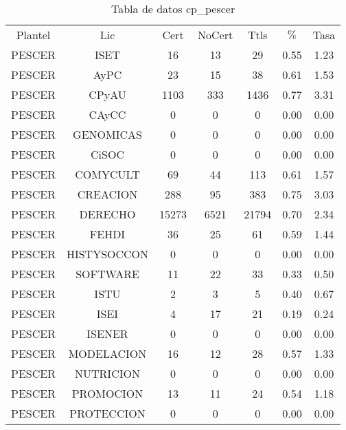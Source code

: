 \documentclass[12pt]{article}
\begin{document}
\begin{table}[h]
\centering
\begin{tabular}{ccccccc}

Plantel & Lic & Cert & NoCert & Ttls & $\%$ & Tasa \\

PESCER & ISET & 16 & 13 & 29 & 0.55 & 1.23 \\
PESCER & AyPC & 23 & 15 & 38 & 0.61 & 1.53 \\
PESCER & CPyAU & 1103 & 333 & 1436 & 0.77 & 3.31 \\
PESCER & CAyCC & 0 & 0 & 0 & 0.00 & 0.00 \\
PESCER & GENOMICAS & 0 & 0 & 0 & 0.00 & 0.00 \\
PESCER & CiSOC & 0 & 0 & 0 & 0.00 & 0.00 \\
PESCER & COMYCULT & 69 & 44 & 113 & 0.61 & 1.57 \\
PESCER & CREACION & 288 & 95 & 383 & 0.75 & 3.03 \\
PESCER & DERECHO & 15273 & 6521 & 21794 & 0.70 & 2.34 \\
PESCER & FEHDI & 36 & 25 & 61 & 0.59 & 1.44 \\
PESCER & HISTYSOCCON & 0 & 0 & 0 & 0.00 & 0.00 \\
PESCER & SOFTWARE & 11 & 22 & 33 & 0.33 & 0.50 \\
PESCER & ISTU & 2 & 3 & 5 & 0.40 & 0.67 \\
PESCER & ISEI & 4 & 17 & 21 & 0.19 & 0.24 \\
PESCER & ISENER & 0 & 0 & 0 & 0.00 & 0.00 \\
PESCER & MODELACION & 16 & 12 & 28 & 0.57 & 1.33 \\
PESCER & NUTRICION & 0 & 0 & 0 & 0.00 & 0.00 \\
PESCER & PROMOCION & 13 & 11 & 24 & 0.54 & 1.18 \\
PESCER & PROTECCION & 0 & 0 & 0 & 0.00 & 0.00 \\

\end{tabular}
\caption{Tabla de datos cp\_pescer}
\end{table}

\newpage
\end{document}
